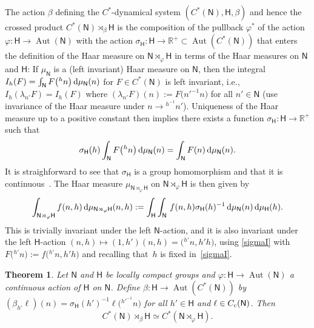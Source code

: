 \documentclass[pdftex]{sigma}
\numberwithin{equation}{section}
\def\dd{{\rm d}}
\newcommand{\sfH}{\mathsf{H}}
\newcommand{\sfN}{\mathsf{N}}
\newcommand{\Aut}{\operatorname{Aut}}
\newcommand{\real}{{\mathbb R}} %
\newtheorem{Theorem}{Theorem}[section]
\begin{document}
The action $\beta$
defining the $C^*$-dynamical system $(C^*(\sfN ),\sfH ,\beta)$ and hence the crossed
product $C^*(\sfN )\rtimes_\beta \sfH $ is the composition
of the pullback $\varphi^*$ of the action $\varphi\colon \sfH \to \Aut(\sfN )$ with
the action $\sigma_\sfH\colon \sfH \to \real^+\subset \Aut(C^*(\sfN ))$ that enters the
definition of the Haar measure on $\sfN \rtimes_\varphi \sfH $ in terms of the Haar
measures on $\sfN $ and $\sfH $: If $\mu_\sfN $ is a (left invariant)
Haar measure on $\sfN $, then the integral
$I_h(F)=\int_\sfN F\big({}^hn\big)\, \dd\mu_\sfN (n)$ for $F\in C^*(\sfN )$
is left invariant, i.e.,
$I_h(\lambda_{n'}F)= I_h(F)$ where $(\lambda_{n'}F)(n):=F\big(n'^{-1} n\big)$
for all $n'\in \sfN $
(use invariance of the Haar measure under $n\to {}^{h^{-1\!}}n'$).
Uniqueness of the Haar measure up to a positive constant then
implies there exists a function $\sigma_\sfH\colon \sfH\to\real^+$ such that
\begin{gather}\label{sigmaI}
\sigma_\sfH(h) \int_\sfN F\big({}^hn\big) \, \dd\mu_\sfN (n)=\int_\sfN F(n)
\, \dd\mu_\sfN (n) .
\end{gather}
It is straighforward to see that
$\sigma_\sfH$ is a group homomorphism and that it is
continuous~\cite[Section~2]{Williams2007}. The Haar measure
$\mu_{\sfN\rtimes_\varphi\sfH}$ on
$\sfN \rtimes_\varphi \sfH $ is then given by
\[
\int_{\sfN\rtimes_\varphi\sfH} f(n,h) \,
\dd\mu_{\sfN\rtimes_\varphi\sfH}(n,h) := \int_\sfH \int_\sfN\,
f(n,h) \sigma_\sfH(h)^{-1} \, \dd\mu_\sfN (n) \, \dd\mu_\sfH (h) .
\]
This is trivially invariant under the left $\sfN $-action, and
it is also invariant under the left $\sfH $-action $(n,h)\mapsto
(1,h') (n,h)=\big({}^{h'\!}n, h' h\big)$, using \eqref{sigmaI} with $F\big({}^{h'\!}n\big) :=f\big({}^{h'\!}n, h' h\big)$
and recalling that~$h$ is fixed in~\eqref{sigmaI}.

\begin{Theorem}\label{cpsp2}
Let $\sfN $ and $\sfH $ be locally compact groups
 and $\varphi \colon \sfH \to \Aut(\sfN )$ a continuous action of $\sfH $ on $\sfN $. Define
$\beta\colon \sfH \to \Aut(C^*(\sfN ))$ by $(\beta_{h'}\ell)
(n)=\sigma_\sfH(h')^{-1} \ell\big({}^{h'^{-1\!}}n\big)$ for all $h'\in \sfH $ and
$\ell\in C_{\rm c}(\sfN )$. Then
\[
C^*(\sfN )\rtimes_{\beta}\sfH \simeq C^*(\sfN \rtimes_\varphi
\sfH ) .
\]
\end{Theorem}
\end{document}
